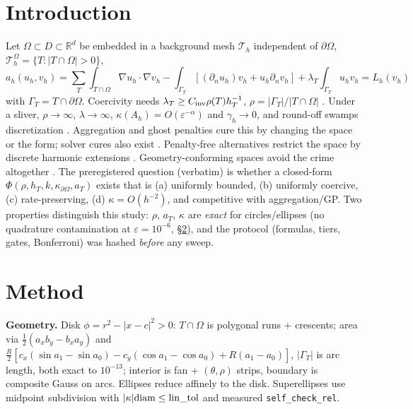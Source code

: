 \documentclass[11pt]{article}
\theoremstyle{definition}
\begin{document}
\section{Introduction}\label{sec:intro}
Let $\Omega\subset D\subset\mathbb R^d$ be embedded in a background mesh
$\mathcal T_h$ independent of $\partial\Omega$,
$\mathcal T_h^{\Omega}=\{T:|T\cap\Omega|>0\}$,
\begin{equation}\label{eq:nitsche}
a_h(u_h,v_h)=\sum_T\!\int_{T\cap\Omega}\!\nabla u_h\!\cdot\!\nabla v_h
-\!\int_{\Gamma_T}\![(\partial_nu_h)v_h+u_h\partial_nv_h]
+\lambda_T\!\int_{\Gamma_T}\!u_hv_h = L_h(v_h)
\end{equation}
with $\Gamma_T=T\cap\partial\Omega$.
Coercivity needs $\lambda_T\ge C_{\rm inv}\rho(T)h_T^{-1}$,
$\rho=|\Gamma_T|/|T\cap\Omega|$ \citep{cui2025multigrid}.
Under a sliver, $\rho\to\infty$, $\lambda\to\infty$,
$\kappa(A_h)=O(\varepsilon^{-\alpha})$ and
$\gamma_h\to0$, and round-off swamps discretization
\citep{burman2023unfitted,zheng2026mixed}.
Aggregation \citep{badia2019aggregated,rangarajan2025cutvem} and
ghost penalties \citep{burman2023unfitted,zheng2026mixed,wengrowski2025matrix}
cure this by changing the space or the form; solver cures also exist
\citep{cui2025multigrid,voet2026deflation}.
Penalty-free alternatives restrict the space by discrete harmonic extensions
\citep{xia2026penaltyfree}.
Geometry-conforming spaces avoid the crime altogether \citep{lin2026geometry}.
The preregistered question (verbatim) is whether a closed-form
$\Phi(\rho,h_T,k,\kappa_{\partial\Omega},a_T)$ exists that is
(a) uniformly bounded, (b) uniformly coercive, (c) rate-preserving, (d)
$\kappa=O(h^{-2})$, and competitive with aggregation/GP. Two properties
distinguish this study: $\rho$, $a_T$, $\kappa$ are \emph{exact} for
circles/ellipses (no quadrature contamination at $\varepsilon=10^{-6}$,
\S\ref{sec:method}), and the protocol (formulas, tiers, gates,
Bonferroni) was hashed \emph{before} any sweep.

\section{Method}\label{sec:method}
\textbf{Geometry.} Disk $\phi=r^2-|x-c|^2>0$: $T\cap\Omega$ is polygonal runs
+ crescents; area via
$\tfrac12(a_xb_y-b_xa_y)$ and
$\tfrac{R}2[c_x(\sin a_1-\sin a_0)-c_y(\cos a_1-\cos a_0)+R(a_1-a_0)]$,
$|\Gamma_T|$ is arc length, both exact to $10^{-13}$; interior is fan +
$(\theta,\rho)$ strips, boundary is composite Gauss on arcs. Ellipses reduce
affinely to the disk. Superellipses use midpoint subdivision with
$|\kappa|{\rm diam}\le{\rm lin\_tol}$ and measured
\texttt{self\_check\_rel}.
\end{document}
